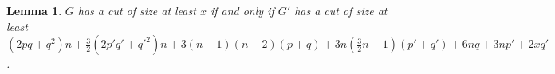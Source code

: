 \documentclass[11pt]{article}
\newtheorem{lemma}{Lemma}
\begin{document}
% 
% 





\begin{lemma} \label{lem6}
 $G$ has a cut of size at least $x$ if and only if $G'$ has a cut of size at least $(2pq + q^2)n +  \frac{3}{2}(2p'q' + q'^2)n +  3(n-1)(n-2)(p+q) + 3n(\frac{3}{2}n-1) (p'+q') + 6nq + 3np' + 2xq'$.
\end{lemma}
\end{document}
